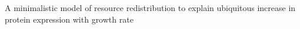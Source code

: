 A minimalistic model of resource redistribution to explain ubiquitous increase in protein expression with growth rate
